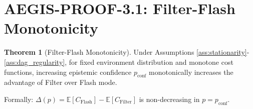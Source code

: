 \documentclass[11pt]{article}
\theoremstyle{definition}
\newtheorem{theorem}{Theorem}
\begin{document}
\section{AEGIS-PROOF-3.1: Filter-Flash Monotonicity}

\begin{theorem}[Filter-Flash Monotonicity]
\label{thm:monotonicity}
Under Assumptions \ref{ass:stationarity}-\ref{ass:dag_regularity}, for fixed environment distribution and monotone cost functions, increasing epistemic confidence $p_{\text{conf}}$ monotonically increases the advantage of Filter over Flash mode.

Formally: $\Delta(p) = \mathbb{E}[C_{\text{Flash}}] - \mathbb{E}[C_{\text{Filter}}]$ is non-decreasing in $p = p_{\text{conf}}$.
\end{theorem}
\end{document}
